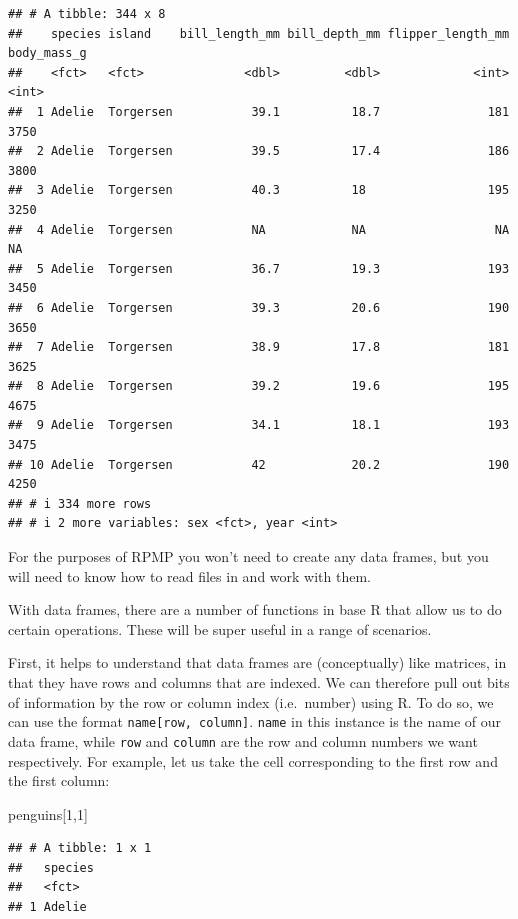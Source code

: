 \documentclass[
]{book}
\newenvironment{Shaded}{\begin{snugshade}}{\end{snugshade}}
\newcommand{\DecValTok}[1]{\textcolor[rgb]{0.00,0.00,0.81}{#1}}
\newcommand{\NormalTok}[1]{#1}
\begin{document}
\begin{verbatim}
## # A tibble: 344 x 8
##    species island    bill_length_mm bill_depth_mm flipper_length_mm body_mass_g
##    <fct>   <fct>              <dbl>         <dbl>             <int>       <int>
##  1 Adelie  Torgersen           39.1          18.7               181        3750
##  2 Adelie  Torgersen           39.5          17.4               186        3800
##  3 Adelie  Torgersen           40.3          18                 195        3250
##  4 Adelie  Torgersen           NA            NA                  NA          NA
##  5 Adelie  Torgersen           36.7          19.3               193        3450
##  6 Adelie  Torgersen           39.3          20.6               190        3650
##  7 Adelie  Torgersen           38.9          17.8               181        3625
##  8 Adelie  Torgersen           39.2          19.6               195        4675
##  9 Adelie  Torgersen           34.1          18.1               193        3475
## 10 Adelie  Torgersen           42            20.2               190        4250
## # i 334 more rows
## # i 2 more variables: sex <fct>, year <int>
\end{verbatim}

For the purposes of RPMP you won't need to create any data frames, but you will need to know how to read files in and work with them.

With data frames, there are a number of functions in base R that allow us to do certain operations. These will be super useful in a range of scenarios.

First, it helps to understand that data frames are (conceptually) like matrices, in that they have rows and columns that are indexed. We can therefore pull out bits of information by the row or column index (i.e.~number) using R. To do so, we can use the format \texttt{name{[}row,\ column{]}}. \texttt{name} in this instance is the name of our data frame, while \texttt{row} and \texttt{column} are the row and column numbers we want respectively. For example, let us take the cell corresponding to the first row and the first column:

\begin{Shaded}
\begin{Highlighting}[]
\NormalTok{penguins[}\DecValTok{1}\NormalTok{,}\DecValTok{1}\NormalTok{]}
\end{Highlighting}
\end{Shaded}

\begin{verbatim}
## # A tibble: 1 x 1
##   species
##   <fct>  
## 1 Adelie
\end{verbatim}
\end{document}
